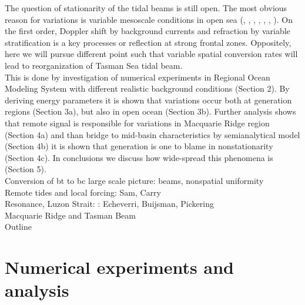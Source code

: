 The question of stationarity of the tidal beams is still open. The most obvious reason for variations is variable mesoscale conditions in open sea (\cite{kerry2016quantifying}, \cite{dunphy2014focusing}, \cite{chavanne2010surface}, \cite{ansong2017semidiurnal}, \cite{dunphy2017low}, \cite{zaron2014time}, \cite{doi:10.1080/03091927509365798}). On the first order, Doppler shift by background currents and refraction by variable stratification is a key processes or reflection at strong frontal zones. Oppositely, here we will pursue different point such that variable spatial conversion rates will lead to reorganization of Tasman Sea tidal beam.\\
This is done by investigation of numerical experiments in Regional Ocean Modeling System with different realistic background conditions (Section 2). By deriving energy parameters it is shown that variations occur both at generation regions (Section 3a), but also in open ocean (Section 3b). Further analysis shows that remote signal is responsible for variations in Macquarie Ridge region (Section 4a) and than bridge to mid-basin characteristics by semianalytical model (Section 4b) it is shown that generation is one to blame in nonstationarity (Section 4c). In conclusions we discuss how wide-spread this phenomena is (Section 5).\\
Conversion of bt to bc large scale picture: beams, nonspatial uniformity\\
Remote tides and local forcing: Sam, Carry\\
Resonance, Luzon Strait: : Echeverri, Buijsman, Pickering\\
Macquarie Ridge and Tasman Beam\\
Outline\\

\section{Numerical experiments and analysis}
